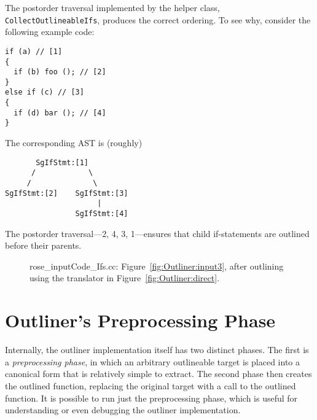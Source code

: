 The postorder traversal implemented by the helper class,
\texttt{CollectOutlineableIfs}, produces the correct ordering.  To see
why, consider the following example code:
%
\begin{lstlisting}
if (a) // [1]
{
  if (b) foo (); // [2]
}
else if (c) // [3]
{
  if (d) bar (); // [4]
}
\end{lstlisting}
%
The corresponding AST is (roughly)
\begin{verbatim}
       SgIfStmt:[1]
      /            \
     /              \
SgIfStmt:[2]    SgIfStmt:[3]
                     | 
                SgIfStmt:[4]
\end{verbatim}
%
The postorder traversal---2, 4, 3, 1---ensures that child
if-statements are outlined before their parents.

\begin{figure}[!h]
{\indent
{\mySmallFontSize
\begin{latexonly}
   
\end{latexonly}
\begin{htmlonly}
   
\end{htmlonly}

}
}
\caption{rose\_inputCode\_Ifs.cc: Figure~\ref{fig:Outliner:input3},
after outlining using the translator in
Figure~\ref{fig:Outliner:direct}.}
\label{fig:Outliner:output3}
\end{figure}

\section{Outliner's Preprocessing Phase}
\label{sec:Outliner:preproc}

Internally, the outliner implementation itself has two distinct
phases. The first is a \emph{preprocessing phase}, in which an
arbitrary outlineable target is placed into a canonical form that is
relatively simple to extract. The second phase then creates the
outlined function, replacing the original target with a call to the
outlined function. It is possible to run just the preprocessing phase,
which is useful for understanding or even debugging the outliner
implementation.

